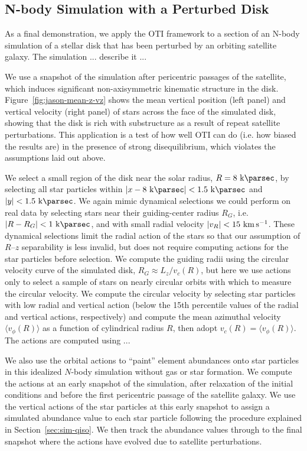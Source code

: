 \subsection{N-body Simulation with a Perturbed Disk}
\label{sec:sim-jason}

As a final demonstration, we apply the OTI framework to a section of an N-body
simulation of a stellar disk that has been perturbed by an orbiting satellite galaxy.
The simulation ... describe it ...

We use a snapshot of the simulation after  pericentric passages of the
satellite, which induces significant non-axisymmetric kinematic structure in the disk.
Figure~\ref{fig:jason-mean-z-vz} shows the mean vertical position (left panel) and
vertical velocity (right panel) of stars across the face of the simulated disk, showing
that the disk is rich with substructure as a result of repeat satellite perturbations.
This application is a test of how well OTI can do (i.e. how biased the results are) in
the presence of strong disequilibrium, which violates the assumptions laid out above.

We select a small region of the disk near the solar radius, $R=8~\kpc$, by selecting all
star particles within $|x-8~\kpc| < 1.5~\kpc$ and $|y| < 1.5~\kpc$.
We again mimic dynamical selections we could perform on real data by selecting stars
near their guiding-center radius $R_G$, i.e. $|R-R_G| < 1~\kpc$, and with small radial
velocity $|v_R| < 15~\kms$.
These dynamical selections limit the radial action of the stars so that our assumption
of $R$--$z$ separability is less invalid, but does not require computing actions for the
star particles before selection.
We compute the guiding radii using the circular velocity curve of the simulated disk,
$R_G \approx L_z / v_c(R)$, but here we use actions only to select a sample of stars on
nearly circular orbits with which to measure the circular velocity.
We compute the circular velocity by selecting star particles with low radial and
vertical action (below the 15th percentile values of the radial and vertical actions,
respectively) and compute the mean azimuthal velocity $\langle v_\phi(R) \rangle$ as a
function of cylindrical radius $R$, then adopt $v_c(R) = \langle v_\phi(R) \rangle$.
The actions are computed using ...

We also use the orbital actions to ``paint'' element abundances onto star particles in
this idealized $N$-body simulation without gas or star formation.
We compute the actions at an early snapshot of the simulation, after relaxation of the
initial conditions and before the first pericentric passage of the satellite galaxy.
We use the vertical actions of the star particles at this early snapshot to assign a
simulated  abundance value to each star particle following the procedure
explained in Section~\ref{sec:sim-qiso}.
We then track the abundance values through to the final snapshot where the actions have
evolved due to satellite perturbations.


